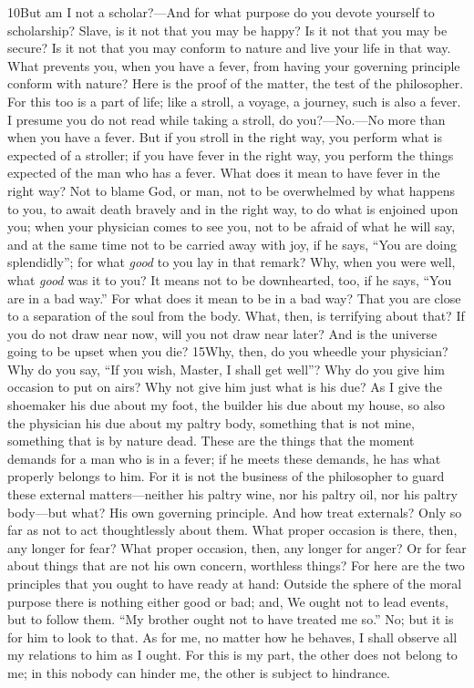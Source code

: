 10But am I not a scholar?—And for what purpose do you devote yourself to scholarship? Slave, is it not that you may be happy? Is it not that you may be secure? Is it not that you may conform to nature and live your life in that way. What prevents you, when you have a fever, from having your governing principle conform with nature? Here is the proof of the matter, the test of the philosopher. For this too is a part of life; like a stroll, a voyage, a journey, such is also a fever. I presume you do not read while taking a stroll, do you?—No.—No more than when you have a fever. But if you stroll in the right way, you perform what is expected of a stroller; if you have fever in the right way, you perform the things expected of the man who has a fever. What does it mean to have fever in the right way? Not to blame God, or man, not to be overwhelmed by what happens to you, to await death bravely and in the right way, to do what is enjoined upon you; when your physician comes to see you, not to be afraid of what he will say, and at the same time not to be carried away with joy, if he says, ``You are doing splendidly''; for what \emph{good} to you lay in that remark? Why, when you were well, what \emph{good} was it to you? It means not to be downhearted, too, if he says, ``You are in a bad way.'' For what does it mean to be in a bad way? That you are close to a separation of the soul from the body. What, then, is terrifying about that? If you do not draw near now, will you not draw near later? And is the universe going to be upset when you die? 15Why, then, do you wheedle your physician? Why do you say, ``If you wish, Master, I shall get well''? Why do you give him occasion to put on airs? Why not give him just what is his due? As I give the shoemaker his due about my foot, the builder his due about my house, so also the physician his due about my paltry body, something that is not mine, something that is by nature dead. These are the things that the moment demands for a man who is in a fever; if he meets these demands, he has what properly belongs to him. For it is not the business of the philosopher to guard these external matters—neither his paltry wine, nor his paltry oil, nor his paltry body—but what? His own governing principle. And how treat externals? Only so far as not to act thoughtlessly about them. What proper occasion is there, then, any longer for fear? What proper occasion, then, any longer for anger? Or for fear about things that are not his own concern, worthless things? For here are the two principles that you ought to have ready at hand: Outside the sphere of the moral purpose there is nothing either good or bad; and, We ought not to lead events, but to follow them. ``My brother ought not to have treated me so.'' No; but it is for him to look to that. As for me, no matter how he behaves, I shall observe all my relations to him as I ought. For this is my part, the other does not belong to me; in this nobody can hinder me, the other is subject to hindrance.


